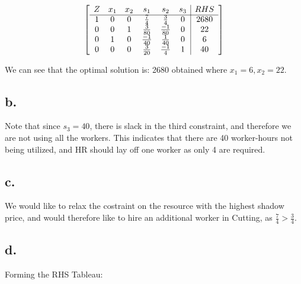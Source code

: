 \documentclass[10pt, letterpaper]{paper}
\begin{document}
\[
	\left[ {\begin{array}{cccccc|c}
	Z & x_1 & x_2 & s_1 & s_2 & s_3 & RHS\\ \cline{1-7}
	1 & 0 & 0 & \frac{7}{4} & \frac{3}{4} & 0 & 2680 \\
	0 & 0 & 1 & \frac{3}{80} & \frac{-1}{80} & 0 &22\\
	0 & 1 & 0 & \frac{-1}{40} & \frac{1}{40} & 0 & 6\\
	0 & 0 & 0 & \frac{3}{20} & \frac{-1}{4} & 1 & 40 \\
	\end{array} } \right]
\]

We can see that the optimal solution is: 2680 obtained where $x_1 = 6,x_2 = 22$.

\subsection*{b.}
Note that since $s_3 = 40$, there is slack in the third constraint, and therefore we are not using all the workers. This indicates that there are 40 worker-hours not being utilized, and HR should lay off one worker as only 4 are required.

\subsection*{c.}
We would like to relax the costraint on the resource with the highest shadow price, and would therefore like to hire an additional worker in Cutting, as
$\frac{7}{4} > \frac{3}{4}$.

\subsection*{d.}
Forming the RHS Tableau:
\end{document}
